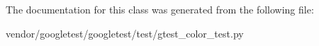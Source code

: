 The documentation for this class was generated from the following file\+:\begin{DoxyCompactItemize}
\item 
vendor/googletest/googletest/test/gtest\+\_\+color\+\_\+test.\+py\end{DoxyCompactItemize}
